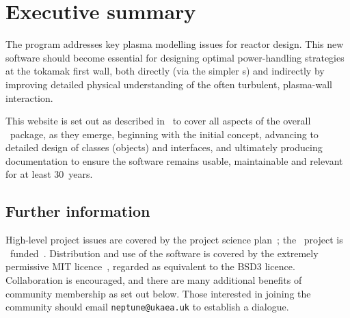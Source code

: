 \section{Executive summary}

The program addresses key plasma modelling issues for reactor design.
This new software should become essential for designing optimal 
power-handling strategies at the tokamak first wall, both directly (via the 
simpler \papp s) and indirectly by improving detailed physical understanding of the 
often turbulent,  plasma-wall interaction.

This website is set out as described in~\cite{y2d34} 
to cover all aspects of the overall \nep \ package, as they emerge,
beginning with the initial concept, advancing to detailed design
of classes (objects) and  interfaces, and ultimately producing documentation
to ensure the software remains usable, maintainable and relevant for at least 30~years.


\subsection{Further information}
High-level project issues are covered by the project science plan~\cite{sciplan};
the \nep \ project is \exc \ funded~\cite{exch+eswebsite}. 
Distribution and use of the software is covered by the extremely
permissive MIT licence~\cite{MITlicense}, regarded as equivalent to the BSD3 licence.
Collaboration is encouraged, and there are many additional benefits of community membership
as set out below. Those interested in joining the community should
 email {\tt neptune@ukaea.uk} to establish a dialogue.


